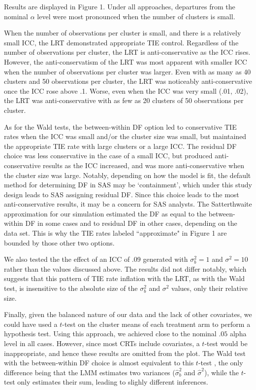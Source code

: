 \documentclass[twocolumn]{bmcart}%
\begin{document}
Results are displayed in Figure 1.  Under all approaches, departures from the nominal $\alpha$ level were most pronounced when the number of clusters is small.

When the number of observations per cluster is small, and there is a relatively small ICC, the LRT demonstrated appropriate TIE control. Regardless of the number of observations per cluster, the LRT is anti-conservative as the ICC rises. However, the anti-conservatism of the LRT was most apparent with smaller ICC when the number of observations per cluster was larger. Even with as many as 40 clusters and 50 observations per cluster, the LRT was noticeably anti-conservative once the ICC rose above .1. Worse, even when the ICC was very small (.01, .02), the LRT was anti-conservative with as few as 20 clusters of 50 observations per cluster.

As for the Wald tests, the between-within DF option led to conservative TIE rates when the ICC was small and/or the cluster size was small, but maintained the appropriate TIE rate with large clusters or a large ICC. The residual DF choice was less conservative in the case of a small ICC, but produced anti-conservative results as the ICC increased, and was more anti-conservative when the cluster size was large. Notably, depending on how the model is fit, the default method for determining DF in SAS may be `containment', which under this study design leads to SAS assigning residual DF. Since this choice leads to the most anti-conservative results, it may be a concern for SAS analysts. The Satterthwaite approximation for our simulation estimated the DF as equal to the between-within DF in some cases and to residual DF in other cases, depending on the data set. This is why the TIE rates labeled ``approximate" in Figure 1 are bounded by those other two options.

We also tested the the effect of an ICC of .09 generated with $\sigma^2_b = 1$ and $\sigma^2 = 10$ rather than the values discussed above. The results did not differ notably, which suggests that this pattern of TIE rate inflation with the LRT, as with the Wald test, is insensitive to the absolute size of the $\sigma^2_b$ and $\sigma^2$ values, only their relative size.

Finally, given the balanced nature of our data and the lack of other covariates, we could have used a $t$-test on the cluster means of each treatment arm to perform a hypothesis test. Using this approach, we achieved close to the nominal $.05$ alpha level in all cases. However, since most CRTs include covariates, a $t$-test would be inappropriate, and hence these results are omitted from the plot. The Wald test with the between-within DF choice is almost equivalent to this $t$-test \cite{moerbeek_comparison_2003}, the only difference being that the LMM estimates two variances ($\hat{\sigma}_b^2$ and $\hat{\sigma}^2$), while the $t$-test only estimates their sum, leading to slighly different inferences.
\end{document}
